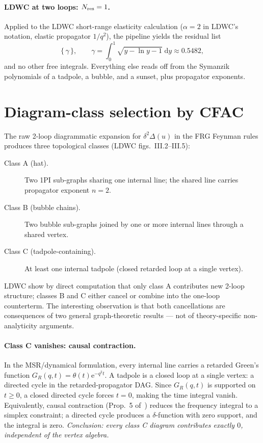 \documentclass[10pt,a4paper,twocolumn]{article}
\theoremstyle{plain}
\theoremstyle{definition}
\newcommand{\dd}{\mathrm{d}}
\newcommand{\ee}{\mathrm{e}}
\newcommand{\Nres}{N_{\rm res}}
\begin{document}
\paragraph{LDWC at two loops: $\Nres = 1$.}
Applied to the LDWC short-range elasticity calculation ($\alpha=2$
in LDWC's notation, elastic propagator $1/q^2$), the pipeline
yields the residual list
\[
  \bigl\{\,\gamma\,\bigr\},
  \qquad
  \gamma = \int_0^1\!\!\sqrt{y - \ln y - 1}\;\dd y \approx 0.5482,
\]
and no other free integrals.  Everything else reads off from the
Symanzik polynomials of a tadpole, a bubble, and a sunset, plus
propagator exponents.

\section{Diagram-class selection by CFAC}
\label{sec:classes}

The raw 2-loop diagrammatic expansion for $\delta^2\Delta(u)$ in
the FRG Feynman rules produces three topological classes
(LDWC figs.~III.2--III.5):
\begin{description}
  \item[Class A (hat).]
    Two 1PI sub-graphs sharing one internal line; the shared line
    carries propagator exponent $n=2$.
  \item[Class B (bubble chains).]
    Two bubble sub-graphs joined by one or more internal lines
    through a shared vertex.
  \item[Class C (tadpole-containing).]
    At least one internal tadpole (closed retarded loop at a
    single vertex).
\end{description}
LDWC show by direct computation that only class A contributes
new 2-loop structure; classes B and C either cancel or combine
into the one-loop counterterm.  The interesting observation is
that both cancellations are consequences of two general
graph-theoretic results --- not of theory-specific non-analyticity
arguments.

\paragraph{Class C vanishes: causal contraction.}
In the MSR/dynamical formulation, every internal line carries a
retarded Green's function $G_R(q,t) = \theta(t)\ee^{-q^2 t}$.
A tadpole is a closed loop at a single vertex: a directed cycle in
the retarded-propagator DAG.  Since $G_R(q,t)$ is supported on
$t \ge 0$, a closed directed cycle forces $t = 0$, making the time
integral vanish.
Equivalently, causal contraction (Prop.~5 of~\citep{AmarteifioCFAC2026})
reduces the frequency integral to a simplex constraint; a directed
cycle produces a $\delta$-function with zero support, and the
integral is zero.
\emph{Conclusion: every class C diagram contributes exactly $0$,
independent of the vertex algebra.}
\end{document}
